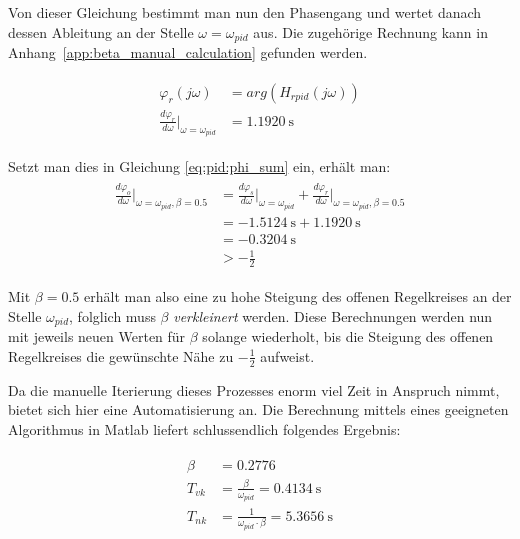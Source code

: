 Von dieser Gleichung bestimmt man nun  den Phasengang und wertet danach dessen
Ableitung an der Stelle $\omega = \omega_{pid}$ aus. Die zugeh\"orige Rechnung
kann in Anhang~\ref{app:beta_manual_calculation} gefunden werden.

\begin{gather} \label{eq:pid:phi_r_first_iteration}
    \begin{split}
        \varphi_r (j\omega)                                            & = arg(H_{rpid}(j\omega))        \\
        \frac{d\varphi_r}{d\omega} \biggr \rvert_{\omega=\omega_{pid}} & = \SI{1.1920}{\second}
    \end{split}
\end{gather}


Setzt man dies in Gleichung \ref{eq:pid:phi_sum} ein, erh\"alt man:
\begin{gather} \label{eq:pid:phi_sum_result_iteration_one}
    \begin{split}
    \frac{d\varphi_o}{d\omega}       \biggr \rvert_{\omega=\omega_{pid}, \beta=0.5}
        & = \frac{d\varphi_s}{d\omega} \biggr \rvert_{\omega=\omega_{pid}}
        + \frac{d\varphi_r}{d\omega} \biggr \rvert_{\omega=\omega_{pid}, \beta=0.5} \\
        & = \SI{-1.5124}{\second} + \SI{1.1920}{\second} \\
        & = \SI{-0.3204}{\second} \\
        & > -\frac{1}{2}
    \end{split}
\end{gather}

Mit  $\beta  = 0.5$  erh\"alt  man  also eine  zu  hohe  Steigung des  offenen
Regelkreises   an    der   Stelle  $\omega_{pid}$,   folglich   muss   $\beta$
\emph{verkleinert} werden.   Diese Berechnungen  werden nun mit  jeweils neuen
Werten  f\"ur  $\beta$  solange  wiederholt,  bis  die  Steigung  des  offenen
Regelkreises die gew\"unschte N\"ahe zu $-\frac{1}{2}$ aufweist.

Da die manuelle Iterierung dieses Prozesses enorm viel Zeit in Anspruch nimmt,
bietet  sich  hier  eine  Automatisierung  an. Die  Berechnung  mittels  eines
geeigneten Algorithmus in Matlab liefert schlussendlich folgendes Ergebnis:

\begin{gather} \label{eq:pid:beta_result}
    \begin{split}
        \beta    & = 0.2776 \\
        {T_{vk}} & = \frac{\beta}{\omega_{pid}}           = \SI{0.4134}{\second} \\
        {T_{nk}} & = \frac{1}{\omega_{pid} \cdot \beta}   = \SI{5.3656}{\second} \\
    \end{split}
\end{gather}

